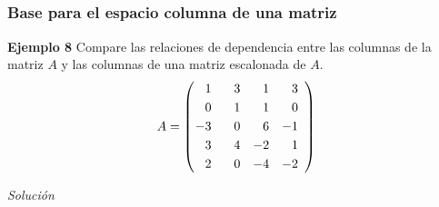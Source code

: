
\subsection{}

\begin{frame}\frametitle{Base para el espacio columna de una matriz}

\begin{ej}{\textbf{Ejemplo  8}}
	Compare las relaciones de dependencia entre las columnas de la matriz $A$ y 
	las columnas de una matriz escalonada de $A$.
	\[
	A = 
	\left( 
	\begin{array}{@{\hspace{0.1\tabcolsep}}rrrr}	
	1 & \phantom{-}3 & 1 &  3 \\[1mm] 
	0 & 1 & 1 &  0 \\[1mm] 
	-3 & 0 & 6 & -1 \\[1mm] 
	3 & 4 & -2 & 1 \\[1mm] 
	2 & 0 & -4 & -2
	\end{array} 
	\right)
	\]
\end{ej}
\textit{Solución}



\end{frame}


\subsection{}

